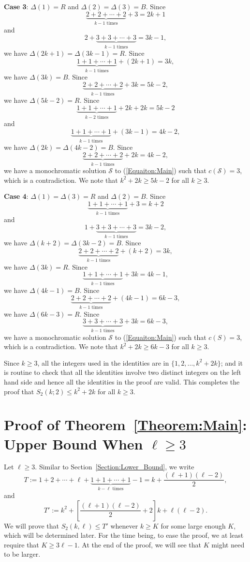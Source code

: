 \documentclass[11pt]{article}
\theoremstyle{definition}
\begin{document}
\textbf{Case 3}: $\Delta(1)=R$ and $\Delta(2)=\Delta(3)=B$. Since 
\[
\underbrace{2+2+\cdots+2}_{k-1\text{ times}}+3=2k+1
\]
and
\[
2+\underbrace{3+3+\cdots+3}_{k-1\text{ times}}=3k-1,
\]
we have $\Delta(2k+1)=\Delta(3k-1)=R$. Since
\[
\underbrace{1+1+\cdots+1}_{k-1\text{ times}}+(2k+1)=3k,
\]
we have $\Delta(3k)=B$. Since
\[
\underbrace{2+2+\cdots+2}_{k-1\text{ times}}+3k=5k-2,
\]
we have $\Delta(5k-2)=R$. Since
\[
\underbrace{1+1+\cdots+1}_{k-2\text{ times}}+2k+2k=5k-2
\]
and
\[
\underbrace{1+1+\cdots+1}_{k-1\text{ times}}+(3k-1)=4k-2,
\]
we have $\Delta(2k)=\Delta(4k-2)=B$. Since
\[
\underbrace{2+2+\cdots+2}_{k-1\text{ times}}+2k=4k-2,
\]
we have a monochromatic solution $\mathcal{S}$ to (\ref{Equaiton:Main}) such that $c(\mathcal{S})=3$, which is a contradiction. We note that $k^2+2k\geq5k-2$ for all $k\geq3$.

\textbf{Case 4}: $\Delta(1)=\Delta(3)=R$ and $\Delta(2)=B$. Since
\[
\underbrace{1+1+\cdots+1}_{k-1\text{ times}}+3=k+2
\]
and
\[
1+\underbrace{3+3+\cdots+3}_{k-1\text{ times}}=3k-2,
\]
we have $\Delta(k+2)=\Delta(3k-2)=B$. Since
\[
\underbrace{2+2+\cdots+2}_{k-1\text{ times}}+(k+2)=3k,
\]
we have $\Delta(3k)=R$. Since
\[
\underbrace{1+1+\cdots+1}_{k-1\text{ times}}+3k=4k-1,
\]
we have $\Delta(4k-1)=B$. Since
\[
\underbrace{2+2+\cdots+2}_{k-1\text{ times}}+(4k-1)=6k-3,
\]
we have $\Delta(6k-3)=R$. Since
\[
\underbrace{3+3+\cdots+3}_{k-1\text{ times}}+3k=6k-3,
\]
we have a monochromatic solution $\mathcal{S}$ to (\ref{Equaiton:Main}) such that $c(S)=3$, which is a contradiction. We note that $k^2+2k\geq6k-3$ for all $k\geq3$.

Since $k\geq3$, all the integers used in the identities are in $\{1,2,\ldots,k^2+2k\}$; and it is routine to check that all the identities involve two distinct integers on the left hand side and hence all the identities in the proof are valid. This completes the proof that $S_2(k;2)\leq k^2+2k$ for all $k\geq3$.
\section{Proof of Theorem~\ref{Theorem:Main}: Upper Bound When $\ell\geq3$}\label{Section:Upper_Bound_>=3}
Let $\ell\geq3$. Similar to Section~\ref{Section:Lower_Bound}, we write
\[
T:=1+2+\cdots+\ell+\underbrace{1+1+\cdots+1}_{k-\ell\text{ times}}-1=k+\frac{(\ell+1)(\ell-2)}{2},
\]
and 
\[
T':=k^2+\left[\frac{(\ell+1)(\ell-2)}{2}+2\right]k+\ell(\ell-2).
\]
We will prove that $S_2(k,\ell)\leq T'$ whenever $k\geq K$ for some large enough $K$, which will be determined later. For the time being, to ease the proof, we at least require that $K\geq3\ell-1$. At the end of the proof, we will see that $K$ might need to be larger.
\end{document}
